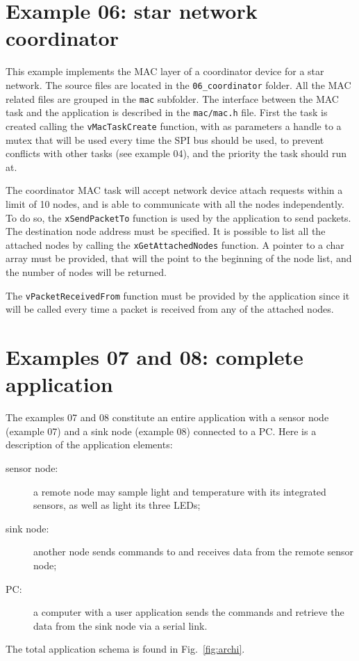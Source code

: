 \documentclass[11pt]{report}
\begin{document}
\section{Example 06: star network coordinator}
This example implements the MAC layer of a coordinator device for a star network. The source files are located in the \verb$06_coordinator$ folder. All the MAC related files are grouped in the \verb$mac$ subfolder. The interface between the MAC task and the application is described in the \verb$mac/mac.h$ file. First the task is created calling the \verb$vMacTaskCreate$ function, with as parameters a handle to a mutex that will be used every time the SPI bus should be used, to prevent conflicts with other tasks (see example 04), and the priority the task should run at.

The coordinator MAC task will accept network device attach requests within a limit of 10 nodes, and is able to communicate with all the nodes independently. To do so, the \verb$xSendPacketTo$ function is used by the application to send packets. The destination node address must be specified. It is possible to list all the attached nodes by calling the \verb$xGetAttachedNodes$ function. A pointer to a char array must be provided, that will the point to the beginning of the node list, and the number of nodes will be returned.

The \verb$vPacketReceivedFrom$ function must be provided by the application since it will be called every time a packet is received from any of the attached nodes.

\section{Examples 07 and 08: complete application}
The examples 07 and 08 constitute an entire application with a sensor node (example 07) and a sink node (example 08) connected to a PC. Here is a description of the application elements:
\begin{description}
	\item[sensor node:] a remote node may sample light and temperature with its integrated sensors, as well as light its three LEDs;
	\item [sink node:] another node sends commands to and receives data from the remote sensor node;
	\item [PC:] a computer with a user application sends the commands and retrieve the data from the sink node via a serial link.
\end{description}
The total application schema is found in Fig.~\ref{fig:archi}.
\end{document}
